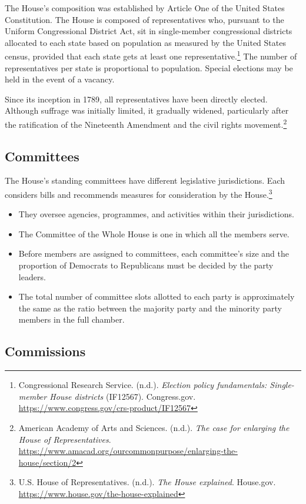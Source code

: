 The House’s composition was established by Article One of the United States Constitution. The House is composed of representatives who, pursuant to the Uniform Congressional District Act, sit in single-member congressional districts allocated to each state based on population as measured by the United States census, provided that each state gets at least one representative.\footnote{Congressional Research Service. (n.d.). \emph{Election policy fundamentals: Single-member House districts} (IF12567). Congress.gov. \url{https://www.congress.gov/crs-product/IF12567}} The number of representatives per state is proportional to population. Special elections may be held in the event of a vacancy.

Since its inception in 1789, all representatives have been directly elected. Although suffrage was initially limited, it gradually widened, particularly after the ratification of the Nineteenth Amendment and the civil rights movement.\footnote{American Academy of Arts and Sciences. (n.d.). \emph{The case for enlarging the House of Representatives}. \url{https://www.amacad.org/ourcommonpurpose/enlarging-the-house/section/2}}

\subsection{Committees}

The House’s standing committees have different legislative jurisdictions. Each considers bills and recommends measures for consideration by the House.\footnote{U.S. House of Representatives. (n.d.). \emph{The House explained}. House.gov. \url{https://www.house.gov/the-house-explained}}

\begin{itemize}
  \item They oversee agencies, programmes, and activities within their jurisdictions.
  \item The Committee of the Whole House is one in which all the members serve.
  \item Before members are assigned to committees, each committee’s size and the proportion of Democrats to Republicans must be decided by the party leaders.
  \item The total number of committee slots allotted to each party is approximately the same as the ratio between the majority party and the minority party members in the full chamber.
\end{itemize}

\subsection{Commissions}

